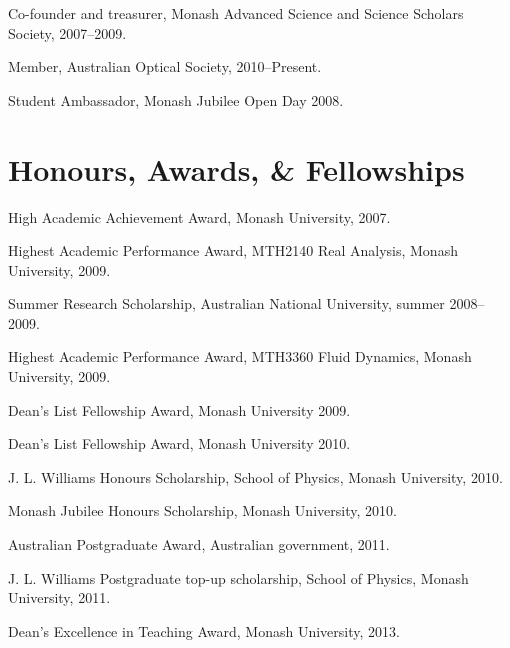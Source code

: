 \documentclass[10pt,letterpaper]{article}
\renewenvironment{itemize}{
  \begin{list}{}{
    \setlength{\leftmargin}{1.5em}
    \setlength{\itemsep}{0.25em}
    \setlength{\parskip}{0pt}
    \setlength{\parsep}{0.25em}
  }
}{
  \end{list}
}
\begin{document}
\begin{itemize}
\item Co-founder and treasurer, Monash Advanced Science and Science Scholars Society, 2007--2009.
\item Member, Australian Optical Society, 2010--Present.
\item Student Ambassador, Monash Jubilee Open Day 2008.
\end{itemize}

\section*{Honours, Awards, \& Fellowships}

\begin{itemize}
\item High Academic Achievement Award, Monash University, 2007.
\item Highest Academic Performance Award, MTH2140 Real Analysis, Monash University, 2009.
\item Summer Research Scholarship, Australian National University, summer 2008--2009.
\item Highest Academic Performance Award, MTH3360 Fluid Dynamics, Monash University, 2009.
\item Dean's List Fellowship Award, Monash University 2009.
\item Dean's List Fellowship Award, Monash University 2010.
\item J. L. Williams Honours Scholarship, School of Physics, Monash University, 2010.
\item Monash Jubilee Honours Scholarship, Monash University, 2010.
\item Australian Postgraduate Award, Australian government, 2011.
\item J. L. Williams Postgraduate top-up scholarship, School of Physics, Monash University, 2011.
\item Dean's Excellence in Teaching Award, Monash University, 2013.
\end{itemize}
\end{document}
